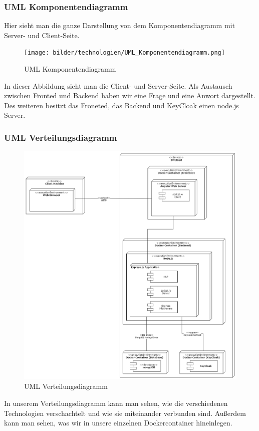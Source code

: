 \newpage

\subsubsection{UML Komponentendiagramm}
Hier sieht man die ganze Darstellung von dem Komponentendiagramm mit Server- und Client-Seite.
\begin{figure}[H]
    \centering
    \texttt{[image: bilder/technologien/UML\_Komponentendiagramm.png]}
    \caption{UML Komponentendiagramm}
    \label{fig:UML Komponentendiagramm}
    \end{figure}
\noindent In dieser Abbildung sieht man die Client- und Server-Seite. 
Als Austausch zwischen Fronted und Backend haben wir eine Frage und eine Anwort dargestellt.
Des weiteren besitzt das Froneted, das Backend und KeyCloak einen node.js Server.

\newpage

\subsubsection{UML Verteilungsdiagramm}

\begin{figure}[H]
\centering
\includegraphics[width=1.0\textwidth]{bilder/technologien/Verteilunsgdiagramm.png}
\caption{UML Verteilungsdiagramm}
\label{fig:UML Verteilungsdiagramm}
\end{figure}
\noindent In unserem Verteilungsdiagramm kann man sehen, 
wie die verschiedenen Technologien verschachtelt und wie sie miteinander verbunden sind.
Außerdem kann man sehen, was wir in unsere einzelnen Dockercontainer hineinlegen.
